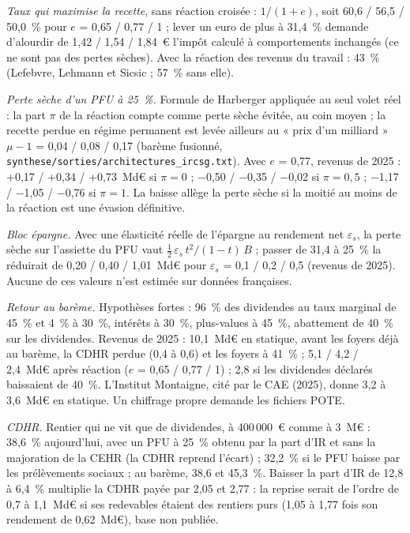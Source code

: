 \documentclass[11pt,a4paper]{article}
\begin{document}
\emph{Taux qui maximise la recette}, sans réaction croisée : $1/(1+e)$, soit 60,6 / 56,5 / 50,0~\% pour $e$ = 0,65 /
0,77 / 1 ; lever un euro de plus à 31,4~\% demande d'alourdir de 1,42 / 1,54 / 1,84~€ l'impôt calculé à comportements
inchangés (ce ne sont pas des pertes sèches). Avec la réaction des revenus du travail : 43~\% (Lefebvre, Lehmann et
Sicsic ; 57~\% sans elle).

\emph{Perte sèche d'un PFU à 25~\%.} Formule de Harberger appliquée au seul volet réel : la part $\pi$ de la réaction
compte comme perte sèche évitée, au coin moyen ; la recette perdue en régime permanent est levée ailleurs au « prix
d'un milliard » $\mu-1$ = 0,04 / 0,08 / 0,17 (barème fusionné, \texttt{synthese/sorties/architectures\_ircsg.txt}).
Avec $e$ = 0,77, revenus de 2025 : +0,17 / +0,34 / +0,73~Md€ si $\pi = 0$ ; $-$0,50 / $-$0,35 / $-$0,02 si
$\pi = 0{,}5$ ; $-$1,17 / $-$1,05 / $-$0,76 si $\pi = 1$. La baisse allège la perte sèche si la moitié au moins de
la réaction est une évasion définitive.

\emph{Bloc épargne.} Avec une élasticité réelle de l'épargne au rendement net $\varepsilon_s$, la perte sèche sur
l'assiette du PFU vaut $\tfrac12\,\varepsilon_s\,t^2/(1-t)\,B$ ; passer de 31,4 à 25~\% la réduirait de 0,20 / 0,40 /
1,01~Md€ pour $\varepsilon_s$ = 0,1 / 0,2 / 0,5 (revenus de 2025). Aucune de ces valeurs n'est estimée sur données
françaises.

\emph{Retour au barème.} Hypothèses fortes : 96~\% des dividendes au taux marginal de 45~\% et 4~\% à 30~\%, intérêts
à 30~\%, plus-values à 45~\%, abattement de 40~\% sur les dividendes. Revenus de 2025 : 10,1~Md€ en statique, avant
les foyers déjà au barème, la CDHR perdue (0,4 à 0,6) et les foyers à 41~\% ; 5,1 / 4,2 / 2,4~Md€ après réaction
($e$ = 0,65 / 0,77 / 1) ; 2,8 si les dividendes déclarés baissaient de 40~\%. L'Institut Montaigne, cité par le CAE
(2025), donne 3,2 à 3,6~Md€ en statique. Un chiffrage propre demande les fichiers POTE.

\emph{CDHR.} Rentier qui ne vit que de dividendes, à 400\,000~€ comme à 3~M€ : 38,6~\% aujourd'hui, avec un PFU à
25~\% obtenu par la part d'IR et sans la majoration de la CEHR (la CDHR reprend l'écart) ; 32,2~\% si le PFU baisse
par les prélèvements sociaux ; au barème, 38,6 et 45,3~\%. Baisser la part d'IR de 12,8 à 6,4~\% multiplie la CDHR payée par 2,05 et 2,77 : la reprise serait de l'ordre de 0,7 à 1,1~Md€ si ses
redevables étaient des rentiers purs (1,05 à 1,77 fois son rendement de 0,62~Md€), base non publiée.
\end{document}
